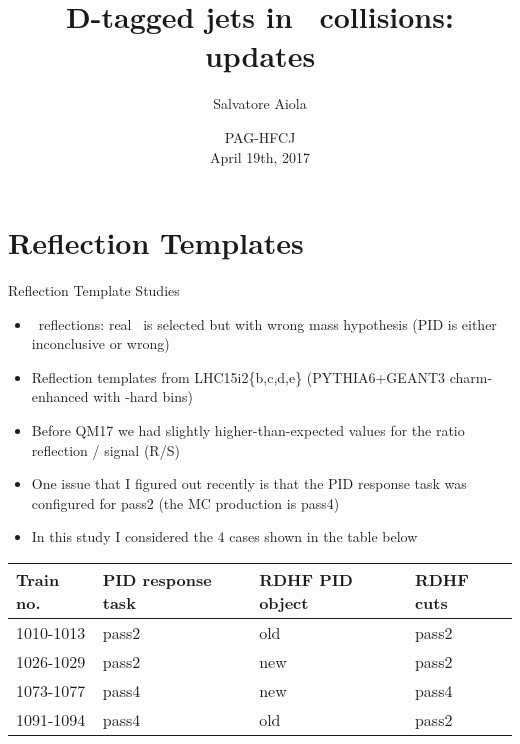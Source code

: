 \documentclass[xcolor={usenames,dvipsnames}]{beamer}
\title[D-tagged jets in \pp] %
{D-tagged jets in \pp\ collisions: updates}
\author[Salvatore Aiola]%
{Salvatore Aiola}
\institute[Yale University] %
{Yale University}
\date[PAG-HFCJ - Apr. 19th, 2017] %
{PAG-HFCJ \\
April 19th, 2017}
\begin{document}
\begin{frame}
  \titlepage
\end{frame}






\section{Reflection Templates}

\begin{frame}{Reflection Template Studies}
\begin{itemize}
\item \Dzero\ reflections: real \Dzero\ is selected but with wrong mass hypothesis (PID is either inconclusive or wrong)
\item Reflection templates from LHC15i2\{b,c,d,e\} (PYTHIA6+GEANT3 charm-enhanced with \pt-hard bins)
\item Before QM17 we had slightly higher-than-expected values for the ratio reflection / signal (R/S)
\item One issue that I figured out recently is that the PID response task was configured for pass2 (the MC production is pass4)
\item In this study I considered the 4 cases shown in the table below
\end{itemize}
\begin{center}
    \begin{tabular}{llll}
    \hline
 Train no. & PID response task & RDHF PID object & RDHF cuts \\ \hline
1010-1013 & pass2 & old  & pass2 \\
1026-1029 & pass2 & new & pass2 \\
1073-1077 & pass4 & new & pass4 \\
1091-1094 & pass4 & old & pass2 \\
\hline
    \end{tabular}
    \end{center}
\end{frame}
\end{document}
